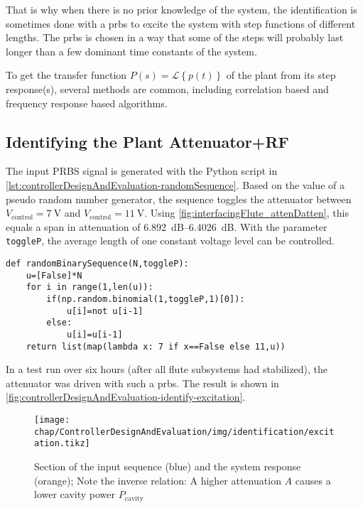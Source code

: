 That is why when there is no prior knowledge of the system, the identification is sometimes done with a \gls{prbs} to excite the system with step functions of different lengths. The \gls{prbs} is chosen in a way that some of the steps will probably last longer than a few dominant time constants of the system. 

To get the transfer function $P(s)=\mathcal{L}\left\{p(t)\right\}$ of the plant from its step response(s), several methods are common, including correlation based and frequency response based algorithms.

\subsection{Identifying the Plant Attenuator+RF}
The input PRBS signal is generated with the Python script in \autoref{lst:controllerDesignAndEvaluation-randomSequence}.
Based on the value of a pseudo random number generator, the sequence toggles the attenuator between $V_\text{control}=\SI{7}{\volt}$ and $V_\text{control}=\SI{11}{\volt}$.
Using \autoref{fig:interfacingFlute_attenDatten}, this equals a span in attenuation of \SIrange{6.892}{6.4026}{\dB}.
With the parameter \texttt{toggleP}, the average length of one constant voltage level can be controlled. 

\begin{lstlisting}[style=python,caption = Function to get a pseudo random binary sequence, label = lst:controllerDesignAndEvaluation-randomSequence]
def randomBinarySequence(N,toggleP):
    u=[False]*N
    for i in range(1,len(u)):
        if(np.random.binomial(1,toggleP,1)[0]):
            u[i]=not u[i-1]
        else:
            u[i]=u[i-1]
    return list(map(lambda x: 7 if x==False else 11,u))
\end{lstlisting}

In a test run over six hours (after all \gls{flute} subsystems had stabilized), the attenuator was driven with such a \gls{prbs}. The result is shown in \autoref{fig:controllerDesignAndEvaluation-identify-excitation}.

\begin{figure}[tb]
	\centering
	\texttt{[image: chap/ControllerDesignAndEvaluation/img/identification/excitation.tikz]}
	\caption{Section of the input sequence (blue) and the system response (orange); Note the inverse relation: A higher attenuation $A$ causes a lower cavity power $P_\text{cavity}$}
	\label{fig:controllerDesignAndEvaluation-identify-excitation}
\end{figure}

